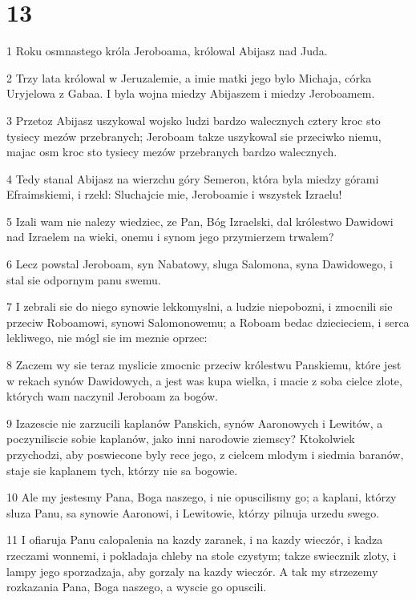 \chapter{13}

\par 1 Roku osmnastego króla Jeroboama, królowal Abijasz nad Juda.
\par 2 Trzy lata królowal w Jeruzalemie, a imie matki jego bylo Michaja, córka Uryjelowa z Gabaa. I byla wojna miedzy Abijaszem i miedzy Jeroboamem.
\par 3 Przetoz Abijasz uszykowal wojsko ludzi bardzo walecznych cztery kroc sto tysiecy mezów przebranych; Jeroboam takze uszykowal sie przeciwko niemu, majac osm kroc sto tysiecy mezów przebranych bardzo walecznych.
\par 4 Tedy stanal Abijasz na wierzchu góry Semeron, która byla miedzy górami Efraimskiemi, i rzekl: Sluchajcie mie, Jeroboamie i wszystek Izraelu!
\par 5 Izali wam nie nalezy wiedziec, ze Pan, Bóg Izraelski, dal królestwo Dawidowi nad Izraelem na wieki, onemu i synom jego przymierzem trwalem?
\par 6 Lecz powstal Jeroboam, syn Nabatowy, sluga Salomona, syna Dawidowego, i stal sie odpornym panu swemu.
\par 7 I zebrali sie do niego synowie lekkomyslni, a ludzie niepobozni, i zmocnili sie przeciw Roboamowi, synowi Salomonowemu; a Roboam bedac dziecieciem, i serca lekliwego, nie mógl sie im meznie oprzec:
\par 8 Zaczem wy sie teraz myslicie zmocnic przeciw królestwu Panskiemu, które jest w rekach synów Dawidowych, a jest was kupa wielka, i macie z soba cielce zlote, których wam naczynil Jeroboam za bogów.
\par 9 Izazescie nie zarzucili kaplanów Panskich, synów Aaronowych i Lewitów, a poczyniliscie sobie kaplanów, jako inni narodowie ziemscy? Ktokolwiek przychodzi, aby poswiecone byly rece jego, z cielcem mlodym i siedmia baranów, staje sie kaplanem tych, którzy nie sa bogowie.
\par 10 Ale my jestesmy Pana, Boga naszego, i nie opuscilismy go; a kaplani, którzy sluza Panu, sa synowie Aaronowi, i Lewitowie, którzy pilnuja urzedu swego.
\par 11 I ofiaruja Panu calopalenia na kazdy zaranek, i na kazdy wieczór, i kadza rzeczami wonnemi, i pokladaja chleby na stole czystym; takze swiecznik zloty, i lampy jego sporzadzaja, aby gorzaly na kazdy wieczór. A tak my strzezemy rozkazania Pana, Boga naszego, a wyscie go opuscili.
